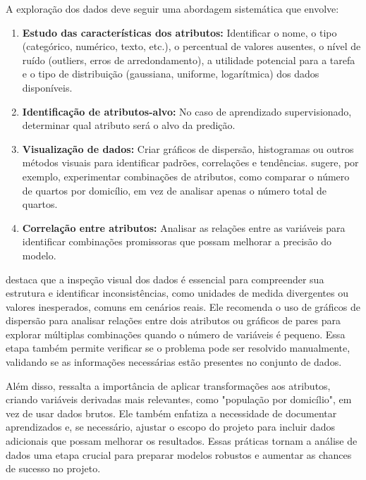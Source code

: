 A exploração dos dados deve seguir uma abordagem sistemática que envolve:

\begin{enumerate}
    \item \textbf{Estudo das características dos atributos:} Identificar o nome, o tipo (categórico, numérico, texto, etc.), o percentual de valores ausentes, o nível de ruído (outliers, erros de arredondamento), a utilidade potencial para a tarefa e o tipo de distribuição (gaussiana, uniforme, logarítmica) dos dados disponíveis.
    \item \textbf{Identificação de atributos-alvo:} No caso de aprendizado supervisionado, determinar qual atributo será o alvo da predição.
    \item \textbf{Visualização de dados:} Criar gráficos de dispersão, histogramas ou outros métodos visuais para identificar padrões, correlações e tendências.  sugere, por exemplo, experimentar combinações de atributos, como comparar o número de quartos por domicílio, em vez de analisar apenas o número total de quartos.
    \item \textbf{Correlação entre atributos:} Analisar as relações entre as variáveis para identificar combinações promissoras que possam melhorar a precisão do modelo.
\end{enumerate}

 destaca que a inspeção visual dos dados é essencial para compreender sua estrutura e identificar inconsistências, como unidades de medida divergentes ou valores inesperados, comuns em cenários reais. Ele recomenda o uso de gráficos de dispersão para analisar relações entre dois atributos ou gráficos de pares para explorar múltiplas combinações quando o número de variáveis é pequeno. Essa etapa também permite verificar se o problema pode ser resolvido manualmente, validando se as informações necessárias estão presentes no conjunto de dados.

Além disso, ressalta a importância de aplicar transformações aos atributos, criando variáveis derivadas mais relevantes, como "população por domicílio", em vez de usar dados brutos. Ele também enfatiza a necessidade de documentar aprendizados e, se necessário, ajustar o escopo do projeto para incluir dados adicionais que possam melhorar os resultados. Essas práticas tornam a análise de dados uma etapa crucial para preparar modelos robustos e aumentar as chances de sucesso no projeto.

